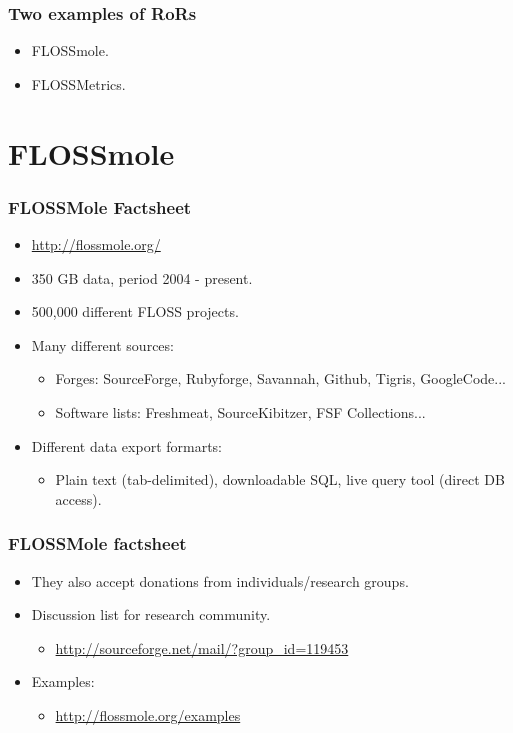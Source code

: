 \documentclass{beamer}
\begin{document}
\begin{frame}
\frametitle{Two examples of RoRs}
\begin{itemize}
\item FLOSSmole.
\item FLOSSMetrics.
\end{itemize}
\end{frame}

\section{FLOSSmole}

\begin{frame}
\frametitle{FLOSSMole Factsheet}
\begin{itemize}
\item \url{http://flossmole.org/}
\item 350 GB data, period 2004 - present.
\item 500,000 different FLOSS projects.
\item Many different sources:
\begin{itemize}
 \item Forges: SourceForge, Rubyforge, Savannah, Github, Tigris, GoogleCode...
 \item Software lists: Freshmeat, SourceKibitzer, FSF Collections...
\end{itemize}
\item Different data export formarts:
\begin{itemize}
 \item Plain text (tab-delimited), downloadable SQL, live query tool (direct DB access).
\end{itemize}

\end{itemize}
\end{frame}

\begin{frame}
\frametitle{FLOSSMole factsheet}
\begin{itemize}
\item They also accept donations from individuals/research groups.
\item Discussion list for research community.
\begin{itemize}
 \item \url{http://sourceforge.net/mail/?group_id=119453}
\end{itemize}
\item Examples:
\begin{itemize}
 \item \url{http://flossmole.org/examples}
\end{itemize}

\end{itemize}
\end{frame}
\end{document}
